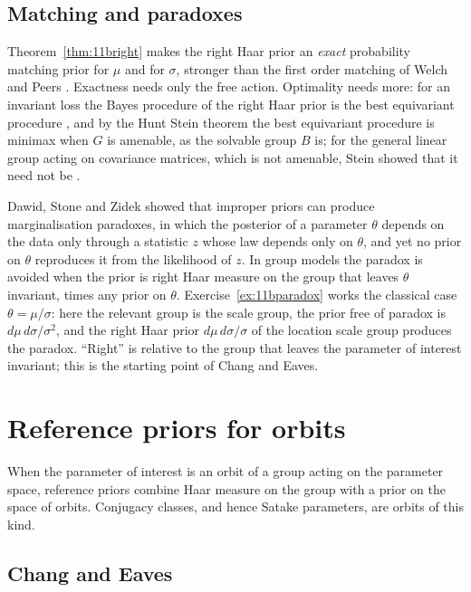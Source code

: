 \subsection{Matching and paradoxes}

Theorem~\ref{thm:11bright} makes the right Haar prior an \emph{exact} probability matching prior for $\mu$ and for $\sigma$, stronger than the first order matching of Welch and Peers \cite{welchpeers1963}. Exactness needs only the free action. Optimality needs more: for an invariant loss the Bayes procedure of the right Haar prior is the best equivariant procedure \cite{horabuehler1966,eaton1989}, and by the Hunt Stein theorem the best equivariant procedure is minimax when $G$ is amenable, as the solvable group $B$ is; for the general linear group acting on covariance matrices, which is not amenable, Stein showed that it need not be \cite{eatongeorge2021}.

Dawid, Stone and Zidek \cite{dawidstonezidek1973} showed that improper priors can produce marginalisation paradoxes, in which the posterior of a parameter $\theta$ depends on the data only through a statistic $z$ whose law depends only on $\theta$, and yet no prior on $\theta$ reproduces it from the likelihood of $z$. In group models the paradox is avoided when the prior is right Haar measure on the group that leaves $\theta$ invariant, times any prior on $\theta$. Exercise~\ref{ex:11bparadox} works the classical case $\theta=\mu/\sigma$: here the relevant group is the scale group, the prior free of paradox is $d\mu\,d\sigma/\sigma^2$, and the right Haar prior $d\mu\,d\sigma/\sigma$ of the location scale group produces the paradox. ``Right'' is relative to the group that leaves the parameter of interest invariant; this is the starting point of Chang and Eaves.

\section{Reference priors for orbits}

When the parameter of interest is an orbit of a group acting on the parameter space, reference priors combine Haar measure on the group with a prior on the space of orbits. Conjugacy classes, and hence Satake parameters, are orbits of this kind.

\subsection{Chang and Eaves}

